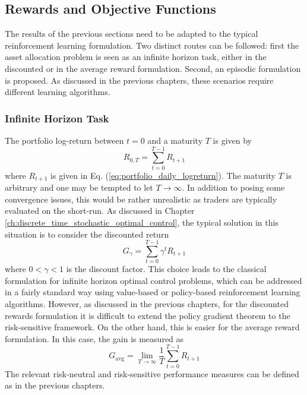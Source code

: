 \subsection{Rewards and Objective Functions}
The results of the previous sections need to be adapted to the typical reinforcement learning formulation. Two distinct routes can be followed: first the asset allocation problem is seen as an infinite horizon task, either in the discounted or in the average reward formulation. Second, an episodic formulation is proposed. As discussed in the previous chapters, these scenarios require different learning algorithms. 

\subsubsection{Infinite Horizon Task}
The portfolio log-return between $t=0$ and a maturity $T$ is given by
\begin{equation*}
	R_{0,T} = \sum_{t=0}^{T-1} R_{t+1}
\end{equation*}
where $R_{t+1}$ is given in Eq. (\ref{eq:portfolio_daily_logreturn}). The maturity $T$ is arbitrary and one may be tempted to let $T \to \infty$. In addition to posing some convergence issues, this would be rather unrealistic as traders are typically evaluated on the short-run. As discussed in Chapter \ref{ch:discrete_time_stochastic_optimal_control}, the typical solution in this situation is to consider the discounted return
\begin{equation*}
	G_\gamma = \sum_{t=0}^{T-1} \gamma^t R_{t+1}
\end{equation*}
where $0 < \gamma < 1$ is the discount factor. This choice leads to the classical formulation for infinite horizon optimal control problems, which can be addressed in a fairly standard way using value-based or policy-based reinforcement learning algorithms. However, as discussed in the previous chapters, for the discounted rewards formulation it is difficult to extend the policy gradient theorem to the risk-sensitive framework. On the other hand, this is easier for the average reward formulation. In this case, the gain is measured as 
\begin{equation*}
	G_\text{avg} = \lim_{T\to\infty} \frac{1}{T} \sum_{t=0}^{T-1} R_{t+1} 
\end{equation*} 
The relevant risk-neutral and risk-sensitive performance measures can be defined as in the previous chapters.\\

